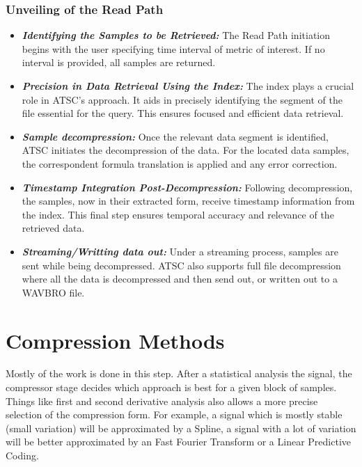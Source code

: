 \documentclass[conference]{IEEEtran}
\begin{document}
\vspace{10pt}
\subsubsection{Unveiling of the Read Path}\label{SCMC}
\begin{itemize}

\item{\textbf{\textit{Identifying the Samples to be Retrieved:}}} The Read Path initiation begins with the user specifying time interval of metric of interest. If no interval is provided, all samples are returned.

\vspace{5pt}
\item{\textbf{\textit{Precision in Data Retrieval Using the Index:}}} The index plays a crucial role in ATSC's approach. It aids in precisely identifying the segment of the file essential for the query. This ensures focused and efficient data retrieval.

\vspace{5pt}
\item{\textbf{\textit{Sample decompression:}}} Once the relevant data segment is identified, ATSC initiates the decompression of the data.
For the located data samples, the correspondent formula translation is applied and any error correction.

\vspace{5pt}
\item{\textbf{\textit{Timestamp Integration Post-Decompression:}}} Following decompression, the samples, now in their extracted form, receive timestamp information from the index. This final step ensures temporal accuracy and relevance of the retrieved data.

\vspace{5pt}
\item{\textbf{\textit{Streaming/Writting data out:}}} Under a streaming process, samples are sent while being decompressed. ATSC also supports full file decompression where all the data is decompressed and then send out, or written out to a WAVBRO file.
\end{itemize}

\section{Compression Methods}

Mostly of the work is done in this step. After a statistical analysis the signal, the compressor stage decides which approach is best for a given block of samples.
Things like first and second derivative analysis also allows a more precise selection of the compression form. 
For example, a signal which is mostly stable (small variation) will be approximated by a Spline, a signal with a lot of variation will be better approximated by an Fast Fourier Transform or a Linear Predictive Coding.
\end{document}
